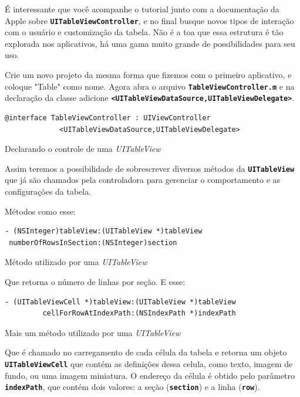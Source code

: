 \documentclass[a4paper,12pt,brazil,doubleside]{book}
\begin{document}
\begin{singlespace}
É interessante que você acompanhe o tutorial junto com a documentação da Apple sobre \texttt{\textbf{UITableViewController}}, e no final busque novos tipos de interação com o usuário e customização da tabela. Não é a toa que essa estrutura é tão explorada nos aplicativos, há uma gama muito grande de possibilidades para seu uso.

Crie um novo projeto da mesma forma que fizemos com o primeiro aplicativo, e coloque "Table" como nome. Agora abra o arquivo \texttt{\textbf{TableViewController.m}} e na declaração da classe adicione \texttt{\textbf{<UITableViewDataSource,UITableViewDelegate>}}.

\begin{listing}[H]
\begin{verbatim}
@interface TableViewController : UIViewController
             <UITableViewDataSource,UITableViewDelegate>
\end{verbatim}
\caption{Declarando o controle de uma \emph{UITableView}}
\end{listing}


Assim teremos a possibilidade de sobrescrever diversos métodos da \texttt{\textbf{UITableView}} que já são chamados pela controladora para gerenciar o comportamento e as configurações da tabela.

Métodos como esse:

\begin{listing}
\begin{verbatim}
- (NSInteger)tableView:(UITableView *)tableView
 numberOfRowsInSection:(NSInteger)section
\end{verbatim}
\caption{Método utilizado por uma \emph{UITableView}}
\end{listing}


Que retorna o número de linhas por seção. E esse:

\begin{listing}
\begin{verbatim}
- (UITableViewCell *)tableView:(UITableView *)tableView
         cellForRowAtIndexPath:(NSIndexPath *)indexPath
\end{verbatim}
\caption{Mais um método utilizado por uma \emph{UITableView}}
\end{listing}


Que é chamado no carregamento de cada célula da tabela e retorna um objeto \texttt{\textbf{UITableViewCell}} que contém as definições dessa celula, como texto, imagem de fundo, ou uma imagem miniatura. O endereço da célula é obtido pelo parâmetro \texttt{\textbf{indexPath}}, que contém dois valores: a seção (\texttt{\textbf{section}}) e a linha (\texttt{\textbf{row}}).


\end{singlespace}
\end{document}
